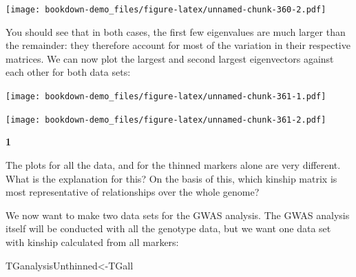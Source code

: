 \documentclass[
]{book}
\makeatletter
\newenvironment{Shaded}{\begin{snugshade}}{\end{snugshade}}
\newcommand{\DecValTok}[1]{\textcolor[rgb]{0.00,0.00,0.81}{#1}}
\newcommand{\FunctionTok}[1]{\textcolor[rgb]{0.00,0.00,0.00}{#1}}
\newcommand{\NormalTok}[1]{#1}
\newcommand{\OtherTok}[1]{\textcolor[rgb]{0.56,0.35,0.01}{#1}}
\newcommand{\SpecialCharTok}[1]{\textcolor[rgb]{0.00,0.00,0.00}{#1}}
\newenvironment{kframe}{%
\medskip{}
\setlength{\fboxsep}{.8em}
 \def\at@end@of@kframe{}%
 \ifinner\ifhmode%
  \def\at@end@of@kframe{\end{minipage}}%
  \begin{minipage}{\columnwidth}%
 \fi\fi%
 \def\FrameCommand##1{\hskip\@totalleftmargin \hskip-\fboxsep
 \colorbox{shadecolor}{##1}\hskip-\fboxsep
     \hskip-\linewidth \hskip-\@totalleftmargin \hskip\columnwidth}%
 \MakeFramed {\advance\hsize-\width
   \@totalleftmargin\z@ \linewidth\hsize
   \@setminipage}}%
 {\par\unskip\endMakeFramed%
 \at@end@of@kframe}
\newenvironment{rmdblock}[1]
  {
  \begin{itemize}
  \renewcommand{\labelitemi}{
    \raisebox{-.7\height}[0pt][0pt]{
      {\setkeys{Gin}{width=3em,keepaspectratio}\texttt{[image: images/\#1]}}
    }
  }
  \setlength{\fboxsep}{1em}
  \begin{kframe}
  \item
  }
  {
  \end{kframe}
  \end{itemize}
  }
\newenvironment{rmdquiz}
  {\begin{rmdblock}{quiz}}
  {\end{rmdblock}}
\makeatother
\begin{document}
\texttt{[image: bookdown-demo\_files/figure-latex/unnamed-chunk-360-2.pdf]}

You should see that in both cases, the first few eigenvalues are much larger than the remainder: they therefore account for most of the variation in their respective matrices. We can now plot the largest and second largest eigenvectors against each other for both data sets:

\begin{Shaded}
\end{Shaded}

\texttt{[image: bookdown-demo\_files/figure-latex/unnamed-chunk-361-1.pdf]}

\begin{Shaded}
\end{Shaded}

\texttt{[image: bookdown-demo\_files/figure-latex/unnamed-chunk-361-2.pdf]}

\begin{rmdquiz}
\textbf{1}

The plots for all the data, and for the thinned markers alone are very different. What is the explanation for this? On the basis of this, which kinship matrix is most representative of relationships over the whole genome?
\end{rmdquiz}

We now want to make two data sets for the GWAS analysis. The GWAS analysis itself will be conducted with all the genotype data, but we want one data set with kinship calculated from all markers:

\begin{Shaded}
\begin{Highlighting}[]
\NormalTok{TGanalysisUnthinned}\OtherTok{\textless{}{-}}\NormalTok{TGall }
\end{Highlighting}
\end{Shaded}
\end{document}
